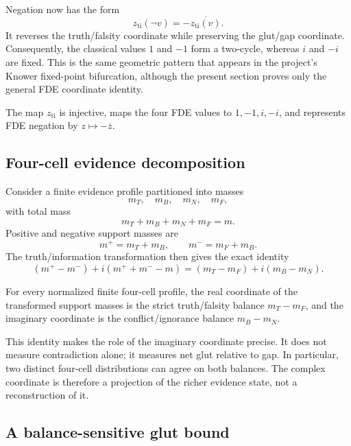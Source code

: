 

Negation now has the form
\[
  z_{\mathrm{ti}}(\neg v)=-\overline{z_{\mathrm{ti}}(v)}.
\]
It reverses the truth/falsity coordinate while preserving the glut/gap
coordinate. Consequently, the classical values \(1\) and \(-1\) form a
two-cycle, whereas \(i\) and \(-i\) are fixed. This is the same geometric
pattern that appears in the project's Knower fixed-point bifurcation, although
the present section proves only the general FDE coordinate identity.

\begin{theorem}
The map \(z_{\mathrm{ti}}\) is injective, maps the four FDE values to
\(1,-1,i,-i\), and represents FDE negation by
\(z\mapsto-\overline z\).
\statusverified
\end{theorem}

\subsection{Four-cell evidence decomposition}

Consider a finite evidence profile partitioned into masses
\[
  m_T,\quad m_B,\quad m_N,\quad m_F,
\]
with total mass
\[
  m_T+m_B+m_N+m_F=m.
\]
Positive and negative support masses are
\[
  m^+=m_T+m_B,
  \qquad
  m^-=m_F+m_B.
\]
The truth/information transformation then gives the exact identity
\[
  (m^+-m^-)+i(m^++m^--m)
  =
  (m_T-m_F)+i(m_B-m_N).
\]

\begin{theorem}
For every normalized finite four-cell profile, the real coordinate of the
transformed support masses is the strict truth/falsity balance \(m_T-m_F\),
and the imaginary coordinate is the conflict/ignorance balance \(m_B-m_N\).
\statusverified
\end{theorem}

This identity makes the role of the imaginary coordinate precise. It does not
measure contradiction alone; it measures net glut relative to gap. In
particular, two distinct four-cell distributions can agree on both balances.
The complex coordinate is therefore a projection of the richer evidence state,
not a reconstruction of it.

\subsection{A balance-sensitive glut bound}

